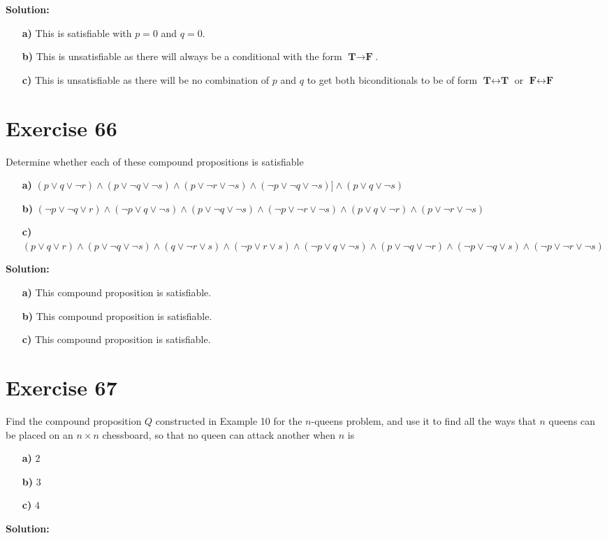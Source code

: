 \documentclass{Axon}
\begin{document}
\noindent
\textbf{Solution:}
\begin{enumerate}
    \item[\textbf{a)}] This is satisfiable with \(p = 0\) and \(q = 0\).
    \item[\textbf{b)}] This is unsatisfiable as there will always be a conditional with the form \(\textbf{T} \to \textbf{F}\).
    \item[\textbf{c)}] This is unsatisfiable as there will be no combination of \(p\) and \(q\) to get both biconditionals to be of form \(\textbf{T} \leftrightarrow \textbf{T}\) or \(\textbf{F} \leftrightarrow \textbf{F}\)
\end{enumerate}

\section*{Exercise 66}
Determine whether each of these compound propositions is satisfiable
\begin{enumerate}
    \item[\textbf{a)}] \((p \lor q \lor \lnot r) \land (p \lor \lnot q \lor \lnot s) \land (p \lor \lnot r \lor \lnot s) \land (\lnot p \lor \lnot q \lor \lnot s) ]\land (p \lor q \lor \lnot s)\)
    \item[\textbf{b)}] \((\lnot p \lor \lnot q \lor r) \land (\lnot p \lor q \lor \lnot s) \land (p \lor \lnot q \lor \lnot s) \land (\lnot p \lor \lnot r \lor \lnot s) \land (p \lor q \lor \lnot r) \land (p \lor \lnot r \lor \lnot s)\)
    \item[\textbf{c)}] \((p \lor q \lor r) \land (p \lor \lnot q \lor \lnot s) \land (q \lor \lnot r \lor s) \land (\lnot p \lor r \lor s) \land (\lnot p \lor q \lor \lnot s) \land (p \lor \lnot q \lor \lnot r) \land(\lnot p \lor \lnot q \lor s) \land (\lnot p \lor \lnot r \lor \lnot s)\)
\end{enumerate}

\noindent
\textbf{Solution:}
\begin{enumerate}
    \item[\textbf{a)}] This compound proposition is satisfiable.
    \item[\textbf{b)}] This compound proposition is satisfiable.
    \item[\textbf{c)}] This compound proposition is satisfiable.
\end{enumerate}

\section*{Exercise 67}
Find the compound proposition \(Q\) constructed in Example 10 for the \(n\)-queens problem, and use it to find all the ways that \(n\) queens can be placed on an \(n \times n\) chessboard, so that no queen can attack another when \(n\) is
\begin{enumerate}
    \item[\textbf{a)}] \(2\)
    \item[\textbf{b)}] \(3\)
    \item[\textbf{c)}] \(4\)
\end{enumerate}

\noindent
\textbf{Solution:}

\printbibliography
\end{document}
